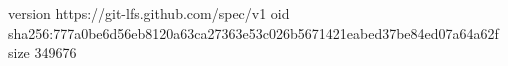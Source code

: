 version https://git-lfs.github.com/spec/v1
oid sha256:777a0be6d56eb8120a63ca27363e53c026b5671421eabed37be84ed07a64a62f
size 349676
